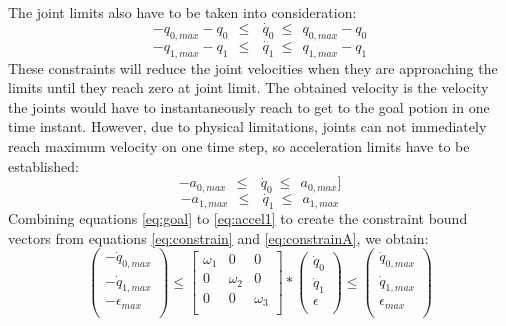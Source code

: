 The joint limits also have to be taken into consideration:
\begin{equation}
-q_{0,max} - q_{0}\ \ \leq\ \ \dot{\ q_{0}}\ \leq\ \ q_{0,max} - q_{0}
\end{equation}
\begin{equation}
-q_{1,max} - q_{1}\ \ \leq\ \ \dot{\ q_{1}}\ \leq\ \ q_{1,max} - q_{1}
\end{equation}
These constraints will reduce the joint velocities when they are approaching the limits until they reach zero at joint limit. The obtained velocity is the velocity the joints would have to instantaneously reach to get to the goal potion in one time instant. However, due to physical limitations, joints can not immediately reach maximum velocity on one time step, so acceleration limits have to be established:
\begin{equation}
-a_{0,max}\ \ \leq\ \ \dot{\ q_{0}}\ \leq\ \ a_{0,max}
\label{eq:accel0}]
\end{equation}
\begin{equation}
-a_{1,max}\ \ \leq\ \ \dot{\ q_{1}}\ \leq\ \ a_{1,max}
\label{eq:accel1}
\end{equation}
Combining equations \ref{eq:goal} to \ref{eq:accel1} to create the constraint bound vectors from equations \ref{eq:constrain} and \ref{eq:constrainA}, we obtain:
\begin{equation}
\left( \begin{array}{c}
-\dot{q}_{0,max} \\
-\dot{q}_{1,max} \\
-\epsilon_{max} \\
\end{array}
\right)	\leq 
\left[ \begin{array}{cccc}
\omega_{1} & 0 & 0 \\
0 & \omega_{2} & 0 \\
0 & 0 & \omega_{3} \\
\end{array}
\right] *
\left( \begin{array}{c}
\dot{q}_{0} \\
\dot{q}_{1} \\
\epsilon \\
\end{array}
\right) 
\leq \left( \begin{array}{c}
\dot{q}_{0,max} \\
\dot{q}_{1,max} \\
\epsilon_{max} \\
\end{array}
\right)
\label{eq:state_constr}
\end{equation}
